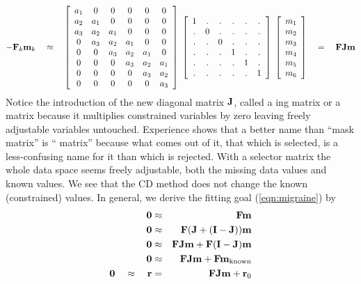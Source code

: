 \begin{equation} 
-\bold F_k \bold m_k
\quad \approx \quad
\left[ 
\begin{array}{cccccc}
  a_1 & 0   & 0    & 0   & 0   & 0   \\
  a_2 & a_1 & 0    & 0   & 0   & 0   \\
  a_3 & a_2 & a_1  & 0   & 0   & 0   \\
  0   & a_3 & a_2  & a_1 & 0   & 0   \\
  0   & 0   & a_3  & a_2 & a_1 & 0   \\
  0   & 0   & 0    & a_3 & a_2 & a_1 \\
  0   & 0   & 0    & 0   & a_3 & a_2 \\
  0   & 0   & 0    & 0   & 0   & a_3 
  \end{array} \right] 
\;
\left[ 
\begin{array}{cccccc}
  1   & .   & .    & .   & .   & .   \\
  .   & 0   & .    & .   & .   & .   \\
  .   & .   & 0    & .   & .   & .   \\
  .   & .   & .    & 1   & .   & .   \\
  .   & .   & .    & .   & 1   & .   \\
  .   & .   & .    & .   & .   & 1  
  \end{array} \right] 
\;
\left[ 
\begin{array}{c}
  m_1 \\ 
  m_2 \\ 
  m_3 \\ 
  m_4 \\ 
  m_5 \\ 
  m_6
  \end{array} \right]
\quad =\quad \bold F \bold J \bold m
\label{eqn:migraine}
\end{equation}
Notice the introduction of the new diagonal matrix $\bold J$,
called a ing matrix or a  matrix
because it multiplies
constrained variables by zero
leaving freely adjustable variables untouched.
Experience shows that a better name than ``mask matrix'' is
`` matrix''
because what comes out of it,
that which is selected,
is a less-confusing name for it than which is rejected.
With a selector matrix the whole data space seems freely adjustable,
both the missing data values and known values.
We see that the CD method does not change the known (constrained) values.
In general, we derive the fitting goal (\ref{eqn:migraine}) by
\begin{eqnarray}
 \label{eqn:misfitgoal}
 \bold 0 &\approx& \bold F \bold m \\
 \bold 0 &\approx& \bold F( \bold J + (\bold I-\bold J) ) \bold m \\
 \bold 0 &\approx& \bold F\bold J\bold m + \bold F(\bold I-\bold J)\bold m \\
 \label{eqn:misfitgoal2}
 \bold 0 &\approx& \bold F\bold J\bold m + \bold F\bold m_{\rm known} \\
                                         \bold 0 \quad\approx\quad
 \bold r &=&       \bold F\bold J\bold m + \bold r_0
\end{eqnarray}

